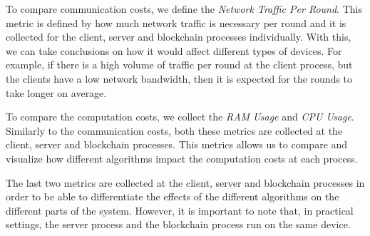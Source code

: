 To compare communication costs, we define the \textit{Network Traffic Per Round}. This metric is defined by how much network traffic is necessary per round and it is collected for the client, server and blockchain processes individually. With this, we can take conclusions on how it would affect different types of devices. For example, if there is a high volume of traffic per round at the client process, but the clients have a low network bandwidth, then it is expected for the rounds to take longer on average.

To compare the computation costs, we collect the \textit{RAM Usage} and \textit{CPU Usage}. Similarly to the communication costs, both these metrics are collected at the client, server and blockchain processes. This metrics allows us to compare and visualize how different algorithms impact the computation costs at each process.

The last two metrics are collected at the client, server and blockchain processes in order to be able to differentiate the effects of the different algorithms on the different parts of the system. However, it is important to note that, in practical settings, the server process and the blockchain process run on the same device.
